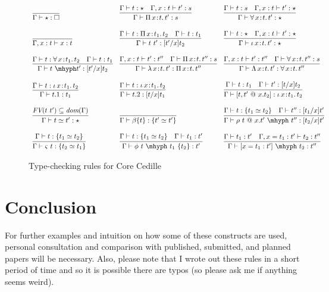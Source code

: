 \documentclass{article}
\newcommand{\abs}[4]{{#1}\, #2\! : \! #3.\, #4}
\begin{document}
\begin{figure}
  \[
  \begin{array}{lll}
    \infer{\Gamma\vdash \star : \Box}{\ } &
    \infer{\Gamma\vdash\abs{\Pi}{x}{t}{t'} : s}{\Gamma \vdash t : \star \quad \Gamma,x:t\vdash t' : s} &
    \infer{\Gamma\vdash\abs{\forall}{x}{t}{t'} : \star}{\Gamma \vdash t : s \quad \Gamma,x:t\vdash t' : \star} 
    \\ \\
    \infer{\Gamma, x : t \vdash x : t}{\ } &
    \infer{\Gamma\vdash t\ t' : [t'/x]t_2}{\Gamma\vdash t : \abs{\Pi}{x}{t_1}{t_2} & \Gamma\vdash t : t_1} &
    \infer{\Gamma\vdash\abs{\iota}{x}{t}{t'} : \star}{\Gamma \vdash t : \star \quad \Gamma,x:t\vdash t' : \star} 
    \\ \\
    \infer{\Gamma\vdash t\ \mhyph t' : [t'/x]t_2}{\Gamma\vdash t : \abs{\forall}{x}{t_1}{t_2} & \Gamma\vdash t : t_1} &
    \infer{\Gamma\vdash\abs{\lambda}{x}{t}{t'} : \abs{\Pi}{x}{t}{t''}}{\Gamma,x:t\vdash t':t'' \quad \Gamma \vdash \abs{\Pi}{x}{t}{t''} : s}  &
    \infer{\Gamma\vdash\abs{\Lambda}{x}{t}{t'} : \abs{\forall}{x}{t}{t''}}{\Gamma,x:t\vdash t':t'' \quad \Gamma \vdash \abs{\forall}{x}{t}{t''} : s} \\ \\
    \infer{\Gamma\vdash t.1 : t_1}{\Gamma\vdash t : \abs{\iota}{x}{t_1}{t_2}} &
    \infer{\Gamma\vdash t.2 : [t/x]t_1}{\Gamma\vdash t : \abs{\iota}{x}{t_1}{t_2}} &    
    \infer{\Gamma\vdash [t,t'\ @\ x.t_2] : \abs{\iota}{x}{t_1}{t_2}}{\Gamma\vdash t : t_1 \quad \Gamma\vdash t' : [t/x]t_2}
    \\ \\
    \infer{\Gamma\vdash t \simeq t' : \star}{\textit{FV}(t\ t')\subseteq \textit{dom}(\Gamma) } &
    \infer{\Gamma\vdash \beta\{t\} : \{ t' \simeq t'\}}{\ } &
    \infer{\Gamma\vdash \rho\ t\ @\ x.t'\ \mhyph\ t'' : [t_2/x]t'}{\Gamma \vdash t : \{ t_1 \simeq t_2 \} \quad \Gamma\vdash t'' : [t_1/x]t'}
    \\ \\
    \infer{\Gamma\vdash \varsigma\ t : \{ t_2 \simeq t_1\}}{\Gamma\vdash t : \{t_1 \simeq t_2\}} &
    \infer{\Gamma\vdash \phi\ t\ \mhyph\ t_1\ \{t_2\} : t'}{\Gamma \vdash t : \{t_1 \simeq t_2\} \quad \Gamma\vdash t_1 : t'} &
    \infer{\Gamma\vdash [ x = t_1 : t' ]\ \mhyph\ t_2 : t''}{\Gamma\vdash t_1 : t' \quad \Gamma, x = t_1 : t' \vdash t_2 : t''} 
  \end{array}
  \]
  \caption{Type-checking rules for Core Cedille}
  \label{fig:rules}
\end{figure}

\section{Conclusion}

For further examples and intuition on how some of these constructs are
used, personal consultation and comparison with published, submitted,
and planned papers will be necessary.  Also, please note that I wrote
out these rules in a short period of time and so it is possible there
are typos (so please ask me if anything seems weird).



\end{document}
